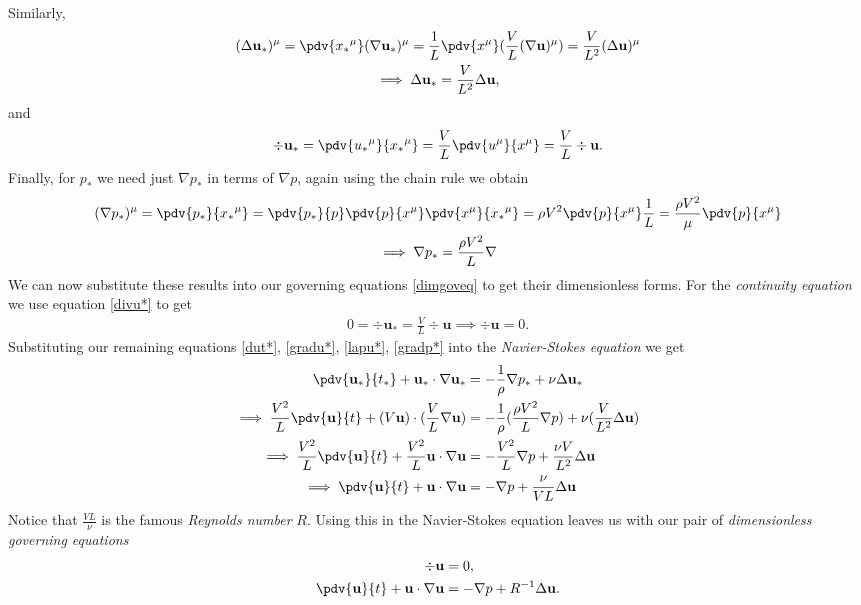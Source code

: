 Similarly,
\begin{gather}
    (\Delta \mathbf{u_*})^\mu = \pdv{{x_*}^\mu} (\nabla \mathbf{u_*})^\mu = \frac{1}{L} \pdv{x^\mu}(\frac{V}{L} (\nabla \mathbf{u})^\mu) = \frac{V}{L^2} (\Delta \mathbf{u})^\mu \nonumber\\
    \implies \Delta \mathbf{u_*} = \frac{V}{L^2} \Delta \mathbf{u},
\label{lapu*}
\end{gather}
and
\begin{gather}
    \div{\mathbf{u_*}} = \pdv{{u_*}^\mu}{{x_*}^\mu} = \frac{V}{L} \pdv{u^\mu}{x^\mu} = \frac{V}{L} \div{\mathbf{u}}.
\label{divu*}
\end{gather}
Finally, for $ p_* $ we need just $ \nabla p_* $ in terms of $ \nabla p $, again using the chain rule we obtain
\begin{gather}
    (\nabla p_*)^\mu = \pdv{p_*}{{x_*}^\mu} = \pdv{p_*}{p} \pdv{p}{x^\mu} \pdv{x^\mu}{{x_*}^\mu} = \rho V^2 \pdv{p}{x^\mu} \frac{1}{L} = \frac{\rho V^2}{\mu} \pdv{p}{x^\mu} \nonumber\\
    \implies \nabla p_* = \frac{\rho V^2}{L} \nabla 
\label{gradp*}
\end{gather}
We can now substitute these results into our governing equations \eqref{dimgoveq} to get their dimensionless forms. For the \emph{continuity equation} we use equation \eqref{divu*} to get
\begin{gather}
    0 = \div{\mathbf{u_*}} = \frac{V}{L} \div{\mathbf{u}} \implies \div{\mathbf{u}} = 0.
\end{gather}
Substituting our remaining equations \eqref{dut*}, \eqref{gradu*}, \eqref{lapu*}, \eqref{gradp*} into the \emph{Navier-Stokes equation} we get
\begin{align}
        \pdv{\mathbf{u_*}}{t_*} + \mathbf{u_*} \cdot \nabla \mathbf{u_*} &= - \frac{1}{\rho} \nabla p_* + \nu \Delta \mathbf{u_*} \nonumber\\
        \implies \frac{V^2}{L} \pdv{\mathbf{u}}{t} + (V \mathbf{u}) \cdot (\frac{V}{L}\nabla \mathbf{u}) &= - \frac{1}{\rho} (\frac{\rho V^2}{L} \nabla p) + \nu (\frac{V}{L^2} \Delta \mathbf{u}) \nonumber\\
        \implies \frac{V^2}{L} \pdv{\mathbf{u}}{t} + \frac{V^2}{L} \mathbf{u} \cdot \nabla \mathbf{u} &= -\frac{V^2}{L} \nabla p + \frac{\nu V}{L^2} \Delta \mathbf{u} \nonumber\\
        \implies \pdv{\mathbf{u}}{t} + \mathbf{u} \cdot \nabla \mathbf{u} &= -\nabla p + \frac{\nu}{V L} \Delta \mathbf{u}
\end{align}
Notice that $ \frac{V L}{\nu} $ is the famous \emph{Reynolds number} $ R $. Using this in the Navier-Stokes equation leaves us with our pair of \emph{dimensionless governing equations}
\begin{align}
    \div{\mathbf{u}} &= 0, \nonumber\\
    \pdv{\mathbf{u}}{t} + \mathbf{u} \cdot \nabla \mathbf{u} &= -\nabla p + R^{-1} \Delta \mathbf{u}.
\label{dlessgoveq}
\end{align}


